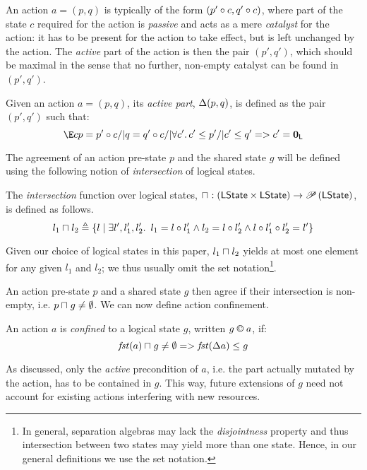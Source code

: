 An action $a = (p, q)$ is typically of the form $(p' \circ c, q' \circ c)$, where part of the state $c$ required for the action is \emph{passive} and acts as a mere \emph{catalyst} for the action: it has to be present for the action to take effect, but is left unchanged by the action. The \emph{active} part of the action is then the pair $(p',q')$, which should be maximal in the sense that no further, non-empty catalyst can be found in $(p',q')$.
%
%
\begin{definition}
Given an action $a = (p, q)$, its \emph{active part}, $\Delta {(p,q)}$, is defined as the pair $(p', q')$ such that:
%
\[
	\E c p = p' \composeL c /| q = q' \composeL c /| \V{c'} c'\leq p' /|
  c'\leq q' => c' = \unitL
\]
%
\end{definition}
%
%
%
The agreement of an action pre-state $p$ and the shared state $g$ will be defined using the following notion of \emph{intersection} of logical states.
%
%
\begin{definition}[Intersection]
The \emph{intersection} function over logical states,
$
\sqcap_{} : \left(\mathsf{LState} \times \mathsf{LState} \right) \rightarrow \mathscr{P}\left(\mathsf{LState} \right)
$, is defined as follows.
%
\[
	l_1 \sqcap_{} l_2 \triangleq 
	\left\{ 
		l  \mid
		\exists l', l_1', l_2'.\,\ l_1 = l \circ l_1' \land l_2 = l \circ l_2' \land l \circ l_1' \circ l_2' = l'
	\right\}
\]
%
\end{definition}
%
Given our choice of logical states in this paper, $l_1\sqcap_{} l_2$ yields at most one element for any given $l_1$ and $l_2$; we thus usually omit the set notation\footnote{In general, separation algebras may lack the \emph{disjointness} property and thus intersection between two states may yield more than one state. Hence, in our general definitions we use the set notation.}.

An action pre-state $p$ and a shared state $g$ then agree if their intersection is non-empty, i.e. $p \sqcap_{} g \not= \emptyset$. We can now define action confinement.
%
%
\begin{definition}\label{def:actconf}
An action $a$ is \emph{confined} to a logical state $g$, written $g\containI a$, if:
%
\[
	\mathit{fst}(a)\sqcap_{} g \neq\emptyset => \mathit{fst}(\Delta {a})\leq g 
\]
\end{definition}
%
As discussed, only the \emph{active} precondition of $a$, i.e. the part actually mutated by the action, has to be contained in $g$. This way, future extensions of $g$ need not account for existing actions interfering with new resources.

